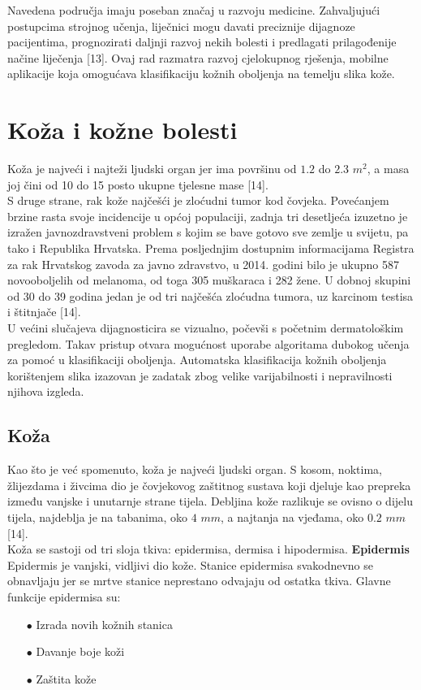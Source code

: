\documentclass[times, utf8, zavrsni]{fer}
\begin{document}
%
\indent{}
Navedena područja imaju poseban značaj u razvoju medicine. Zahvaljujući postupcima strojnog učenja, liječnici mogu davati preciznije dijagnoze pacijentima, prognozirati daljnji razvoj nekih bolesti i predlagati prilagođenije načine liječenja [13]. Ovaj rad razmatra razvoj cjelokupnog rješenja, mobilne aplikacije koja omogućava klasifikaciju kožnih oboljenja na temelju slika kože.


\chapter{Koža i kožne bolesti}

\indent{}
Koža je najveći i najteži ljudski organ jer ima površinu od $1.2$ do $2.3$ $m^2$, a masa joj čini od 10 do 15 posto ukupne tjelesne mase [14].\\
%
\indent{}
S druge strane, rak kože najčešći je zloćudni tumor kod čovjeka. Povećanjem brzine rasta svoje incidencije u općoj populaciji, zadnja tri desetljeća izuzetno je izražen javnozdravstveni problem s kojim se bave gotovo sve zemlje u svijetu, pa tako i Republika Hrvatska. Prema posljednjim dostupnim informacijama Registra za rak Hrvatskog zavoda za javno zdravstvo, u 2014. godini bilo je ukupno 587 novooboljelih od melanoma, od toga 305 muškaraca i 282 žene. U dobnoj skupini od  30 do 39 godina jedan je od tri najčešća zloćudna tumora, uz karcinom testisa i štitnjače [14].\\
%
\indent{}
U većini slučajeva dijagnosticira se vizualno, počevši s početnim dermatološkim pregledom. Takav pristup otvara mogućnost uporabe algoritama dubokog učenja za pomoć u klasifikaciji oboljenja. Automatska klasifikacija kožnih oboljenja korištenjem slika izazovan je zadatak zbog velike varijabilnosti i nepravilnosti njihova izgleda.


\section{Koža}

\indent{}
Kao što je već spomenuto, koža je najveći ljudski organ. S kosom, noktima, žlijezdama i živcima dio je čovjekovog zaštitnog sustava koji djeluje kao prepreka između vanjske i unutarnje strane tijela. Debljina kože razlikuje se ovisno o dijelu tijela, najdeblja je na tabanima, oko $4$ $mm$, a najtanja na vjeđama, oko $0.2$ $mm$ [14].\\
%
\indent{}
Koža se sastoji od tri sloja tkiva: epidermisa, dermisa i hipodermisa.
\newpage{}
%
\textbf{Epidermis}\\
\indent{}
Epidermis je vanjski, vidljivi dio kože. Stanice epidermisa svakodnevno se obnavljaju jer se mrtve stanice neprestano odvajaju od ostatka tkiva. Glavne funkcije epidermisa su:
\begin{itemize}
\item[$\bullet$] Izrada novih kožnih stanica
\item[$\bullet$] Davanje boje koži
\item[$\bullet$] Zaštita kože
\end{itemize}
\end{document}
